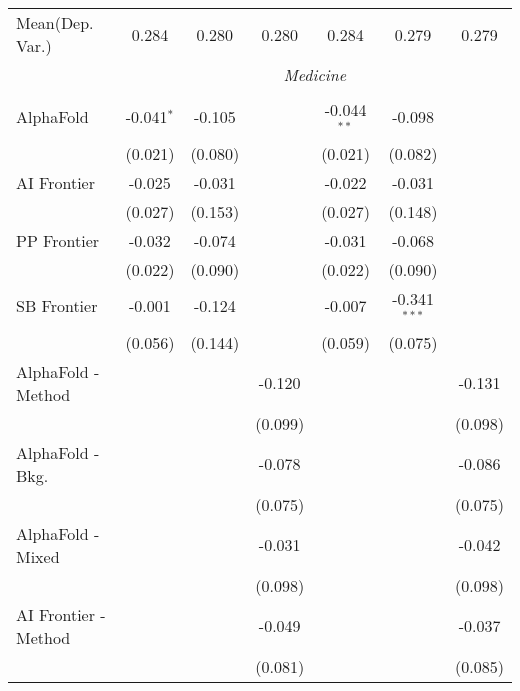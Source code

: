 \begin{tabular}{lcccccc}
Mean(Dep. Var.) & 0.284 & 0.280 & 0.280 & 0.284 & 0.279 & 0.279 \\
 & \multicolumn{6}{c}{\textit{Medicine}} \\ \\
   AlphaFold            & -0.041$^{*}$ & -0.105  &                & -0.044$^{**}$ & -0.098         &   \\   
                        & (0.021)      & (0.080) &                & (0.021)       & (0.082)        &   \\   
   AI Frontier          & -0.025       & -0.031  &                & -0.022        & -0.031         &   \\   
                        & (0.027)      & (0.153) &                & (0.027)       & (0.148)        &   \\   
   PP Frontier          & -0.032       & -0.074  &                & -0.031        & -0.068         &   \\   
                        & (0.022)      & (0.090) &                & (0.022)       & (0.090)        &   \\   
   SB Frontier          & -0.001       & -0.124  &                & -0.007        & -0.341$^{***}$ &   \\   
                        & (0.056)      & (0.144) &                & (0.059)       & (0.075)        &   \\   
   AlphaFold - Method   &              &         & -0.120         &               &                & -0.131\\   
                        &              &         & (0.099)        &               &                & (0.098)\\   
   AlphaFold - Bkg.     &              &         & -0.078         &               &                & -0.086\\   
                        &              &         & (0.075)        &               &                & (0.075)\\   
   AlphaFold - Mixed    &              &         & -0.031         &               &                & -0.042\\   
                        &              &         & (0.098)        &               &                & (0.098)\\   
   AI Frontier - Method &              &         & -0.049         &               &                & -0.037\\   
                        &              &         & (0.081)        &               &                & (0.085)\\   

\end{tabular}
